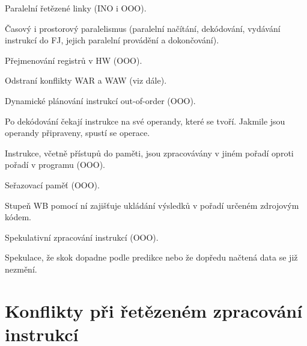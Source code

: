\begin{compactitem}
    \item Paralelní řetězené linky (INO i OOO). \begin{compactitem}
        \item Časový i prostorový paralelismus (paralelní načítání, dekódování, vydávání instrukcí do FJ, jejich paralelní provádění a dokončování).
    \end{compactitem}

    \item Přejmenování registrů v HW (OOO). \begin{compactitem}
        \item Odstraní konflikty WAR a WAW (viz dále).
    \end{compactitem}

    \item Dynamické plánování instrukcí out-of-order (OOO). \begin{compactitem}
        \item Po dekódování čekají instrukce na své operandy, které se tvoří. Jakmile jsou operandy připraveny, spustí se operace.
        \item Instrukce, včetně přístupů do paměti, jsou zpracovávány v jiném pořadí oproti pořadí v programu (OOO).
    \end{compactitem}

    \item Seřazovací paměť (OOO). \begin{compactitem}
        \item Stupeň WB pomocí ní zajišťuje ukládání výsledků v pořadí určeném zdrojovým kódem.
    \end{compactitem}

    \item Spekulativní zpracování instrukcí (OOO). \begin{compactitem}
        \item Spekulace, že skok dopadne podle predikce nebo že dopředu načtená data se již nezmění.
    \end{compactitem}
\end{compactitem}


\section{Konflikty při řetězeném zpracování instrukcí}

